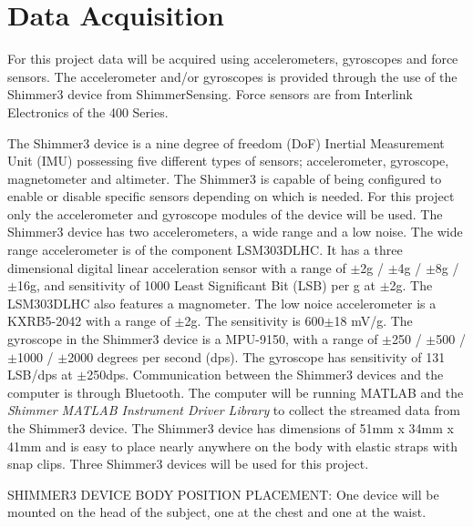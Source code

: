 \section{Data Acquisition}

For this project data will be acquired using accelerometers, gyroscopes and force sensors. The accelerometer and/or gyroscopes is provided through the use of the Shimmer3 device from ShimmerSensing. Force sensors are from Interlink Electronics of the 400 Series. %

The Shimmer3 device is a nine degree of freedom (DoF) Inertial Measurement Unit (IMU) possessing five different types of sensors; accelerometer, gyroscope, magnetometer and altimeter. The Shimmer3 is capable of being configured to enable or disable specific sensors depending on which is needed. For this project only the accelerometer and gyroscope modules of the device will be used. The Shimmer3 device has two accelerometers, a wide range and a low noise. The wide range accelerometer is of the component LSM303DLHC. It has a three dimensional digital linear acceleration sensor with a range of $\pm$2g / $\pm$4g / $\pm$8g / $\pm$16g, and sensitivity of 1000 Least Significant Bit (LSB) per g at $\pm$2g. The LSM303DLHC also features a magnometer. \cite{LSM303DLHC, ShimmerSensing2016} %
The low noice accelerometer is a KXRB5-2042 with a range of $\pm$2g. The sensitivity is 600$\pm$18 mV/g. \cite{ShimmerSensing2016}
The gyroscope in the Shimmer3 device is a MPU-9150, with a range of $\pm$250 / $\pm$500 / $\pm$1000 / $\pm$2000 degrees per second (dps). The gyroscope has sensitivity of 131 LSB/dps at $\pm$250dps. \cite{ShimmerSensing2016}
Communication between the Shimmer3 devices and the computer is through Bluetooth. The computer will be running MATLAB and the \textit{Shimmer MATLAB Instrument Driver Library} to collect the streamed data from the Shimmer3 device. 
The Shimmer3 device has dimensions of 51mm x 34mm x 41mm and is easy to place nearly anywhere on the body with elastic straps with snap clips. Three Shimmer3 devices will be used for this project. 

SHIMMER3 DEVICE BODY POSITION PLACEMENT: One device will be mounted on the head of the subject, one at the chest and one at the waist. 

